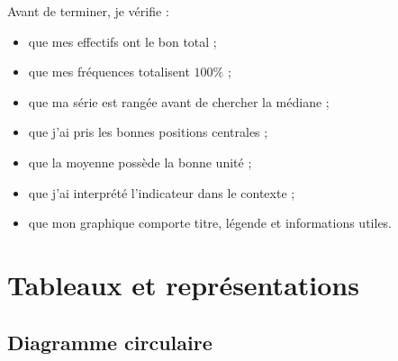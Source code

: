 \documentclass[12pt,a4paper]{article}
\begin{document}
\begin{tcolorbox}[
  enhanced,
  colback=SavoirBg,
  colframe=SavoirC!65,
  boxrule=0.7pt,
  arc=2mm
]
Avant de terminer, je vérifie :

\begin{itemize}
  \item[\(\square\)] que mes effectifs ont le bon total ;
  \item[\(\square\)] que mes fréquences totalisent \(100\%\) ;
  \item[\(\square\)] que ma série est rangée avant de chercher la médiane ;
  \item[\(\square\)] que j'ai pris les bonnes positions centrales ;
  \item[\(\square\)] que la moyenne possède la bonne unité ;
  \item[\(\square\)] que j'ai interprété l'indicateur dans le contexte ;
  \item[\(\square\)] que mon graphique comporte titre, légende et informations utiles.
\end{itemize}
\end{tcolorbox}

\newpage

\section{Tableaux et représentations}


\subsection{Diagramme circulaire}

\end{document}
